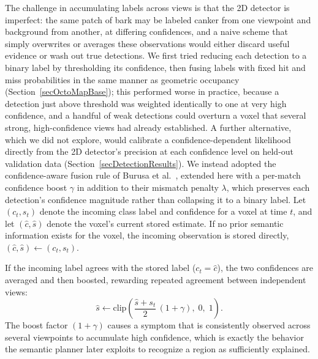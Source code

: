 The challenge in accumulating labels across views is that the 2D detector
is imperfect: the same patch of bark may be labeled canker from one
viewpoint and background from another, at differing confidences, and a
naive scheme that simply overwrites or averages these observations would
either discard useful evidence or wash out true detections.
We first tried reducing each detection to a binary label by thresholding
its confidence, then fusing labels with fixed hit and miss probabilities in
the same manner as geometric occupancy (Section~\ref{secOctoMapBase}); this
performed worse in practice, because a detection just above threshold was
weighted identically to one at very high confidence, and a handful of weak
detections could overturn a voxel that several strong, high-confidence
views had already established.
A further alternative, which we did not explore, would calibrate a
confidence-dependent likelihood directly from the 2D detector's precision
at each confidence level on held-out validation data
(Section~\ref{secDetectionResults}).
We instead adopted the confidence-aware fusion rule of Burusa et
al.~\cite{Burusa2024SemanticsAwareNBVPlantParts}, extended here with a
per-match confidence boost $\gamma$ in addition to their mismatch penalty
$\lambda$, which preserves each detection's confidence magnitude rather
than collapsing it to a binary label.
Let $(c_t, s_t)$ denote the incoming class label and confidence for a voxel
at time $t$, and let $(\hat{c}, \hat{s})$ denote the voxel's current stored
estimate.
If no prior semantic information exists for the voxel, the incoming
observation is stored directly, $(\hat{c}, \hat{s}) \leftarrow (c_t, s_t)$.

If the incoming label agrees with the stored label ($c_t = \hat{c}$), the
two confidences are averaged and then boosted, rewarding repeated agreement
between independent views:
\begin{equation}
\hat{s} \leftarrow \mathrm{clip}\!\left(\frac{\hat{s}+s_t}{2}\,(1 + \gamma),\; 0,\; 1\right).
\label{eqSemMatch}
\end{equation}
The boost factor $(1+\gamma)$ causes a symptom that is consistently
observed across several viewpoints to accumulate high confidence, which is
exactly the behavior the semantic planner later exploits to recognize a
region as sufficiently explained.

